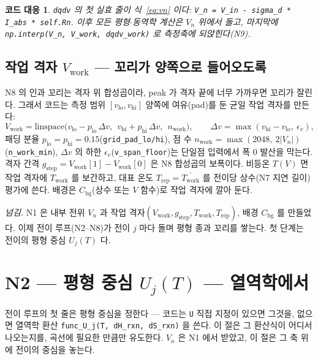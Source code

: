 \documentclass[11pt,a4paper]{article}
\newtheorem*{codebox}{코드 대응}
\newcommand{\bg}{\mathrm{bg}}
\newcommand{\work}{\mathrm{work}}
\newcommand{\rep}{\mathrm{rep}}
\newcommand{\code}[1]{\texttt{#1}}
\begin{document}
\begin{codebox}
\code{dqdv} 의 첫 실효 줄이 식~\eqref{eq:vn} 이다: \code{V\_n = V\_in - sigma\_d * I\_abs * self.Rn}. 이후 모든 평형$\cdot$동역학 계산은 $V_n$ 위에서 돌고, 마지막에 \code{np.interp(V\_n, V\_work, dqdv\_work)} 로 측정축에 되앉힌다(N9).
\end{codebox}

\subsection{작업 격자 $V_\work$ — 꼬리가 양쪽으로 들어오도록}
N8 의 인과 꼬리는 격자 위 합성곱이라, peak 가 격자 끝에 너무 가까우면 꼬리가 잘린다. 그래서 코드는 측정 범위 $[v_\mathrm{lo},v_\mathrm{hi}]$ 양쪽에 여유(pad)를 둔 균일 작업 격자를 만든다:
\begin{equation}
V_\work=\mathrm{linspace}\big(v_\mathrm{lo}-p_\mathrm{lo}\,\Delta v,\ \ v_\mathrm{hi}+p_\mathrm{hi}\,\Delta v,\ \ n_\work\big),\qquad
\Delta v=\max(v_\mathrm{hi}-v_\mathrm{lo},\ \epsilon_v),
\label{eq:vwork}
\end{equation}
패딩 분율 $p_\mathrm{lo}=p_\mathrm{hi}=0.15$(\code{grid\_pad\_lo/hi}), 점 수 $n_\work=\max(2048,\ 2|V_n|)$(\code{n\_work\_min}), $\Delta v$ 의 하한 $\epsilon_v$(\code{v\_span\_floor})는 단일점 입력에서 폭 $0$ 발산을 막는다. 격자 간격 $g_\mathrm{step}=V_\work[1]-V_\work[0]$ 은 N8 합성곱의 보폭이다. 비등온 $T(V)$ 면 작업 격자에 $T_\work$ 를 보간하고, 대표 온도 $T_\rep=\overline{T_\work}$ 를 전이당 상수(N7 지연 길이) 평가에 쓴다. 배경은 $C_\bg$(상수 또는 $V$ 함수)로 작업 격자에 깔아 둔다.

\medskip
\emph{넘김.} N1 은 내부 전위 $V_n$ 과 작업 격자$(V_\work,g_\mathrm{step},T_\work,T_\rep)$, 배경 $C_\bg$ 를 만들었다. 이제 전이 루프(N2--N8)가 전이 $j$ 마다 돌며 평형 종과 꼬리를 쌓는다. 첫 단계는 전이의 평형 중심 $U_j(T)$ 다.

\section{N2 — 평형 중심 $U_j(T)$ — 열역학에서}\label{sec:center}
전이 루프의 첫 줄은 평형 중심을 정한다 — 코드는 \code{U} 직접 지정이 있으면 그것을, 없으면 열역학 환산 \code{func\_U\_j(T, dH\_rxn, dS\_rxn)} 을 쓴다. 이 절은 그 환산식이 어디서 나오는지를, 곡선에 필요한 만큼만 유도한다. $V_n$ 은 N1 에서 받았고, 이 절은 그 축 위에 전이의 중심을 놓는다.
\end{document}
